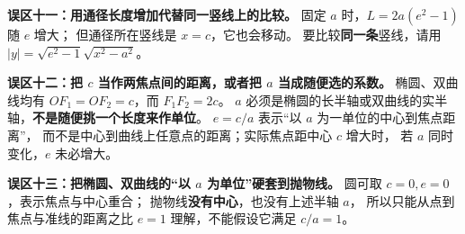 \begin{trapbox}
\medskip
\textbf{误区十一：用通径长度增加代替同一竖线上的比较。}
固定 $a$ 时，$L=2a(e^2-1)$ 随 $e$ 增大；
但通径所在竖线是 $x=c$，它也会移动。
要比较\textbf{同一条}竖线，请用 $|y|=\sqrt{e^2-1}\sqrt{x^2-a^2}$。

\medskip
\textbf{误区十二：把 $c$ 当作两焦点间的距离，或者把 $a$ 当成随便选的系数。}
椭圆、双曲线均有 $OF_1=OF_2=c$，而 $F_1F_2=2c$。
$a$ 必须是椭圆的长半轴或双曲线的实半轴，\textbf{不是随便挑一个长度来作单位}。
$e=c/a$ 表示“以 $a$ 为一单位的中心到焦点距离”，
而不是中心到曲线上任意点的距离；实际焦点距中心 $c$ 增大时，
若 $a$ 同时变化，$e$ 未必增大。

\medskip
\textbf{误区十三：把椭圆、双曲线的“以 $a$ 为单位”硬套到抛物线。}
圆可取 $c=0,e=0$，表示焦点与中心重合；
抛物线\textbf{没有中心}，也没有上述半轴 $a$，
所以只能从点到焦点与准线的距离之比 $e=1$ 理解，不能假设它满足 $c/a=1$。

\end{trapbox}
